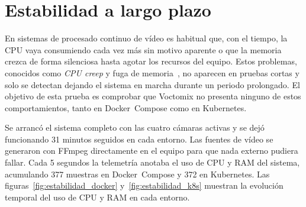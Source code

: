 \section{Estabilidad a largo plazo}
\label{sec:estabilidad}

En sistemas de procesado continuo de vídeo es habitual que, con el tiempo,
la CPU vaya consumiendo cada vez más sin motivo aparente o que la memoria
crezca de forma silenciosa hasta agotar los recursos del equipo. Estos
problemas, conocidos como \textit{CPU creep} y fuga de memoria~\cite{huang1995software}, no aparecen
en pruebas cortas y solo se detectan dejando el sistema en marcha durante un
periodo prolongado. El objetivo de esta prueba es comprobar que Voctomix no
presenta ninguno de estos comportamientos, tanto en Docker~Compose como en
Kubernetes.

Se arrancó el sistema completo con las cuatro cámaras activas y se dejó
funcionando 31 minutos seguidos en cada entorno. Las fuentes de vídeo se
generaron con FFmpeg directamente en el equipo para que nada externo pudiera
fallar. Cada 5 segundos la telemetría anotaba el uso de CPU y RAM del sistema,
acumulando 377 muestras en Docker~Compose y 372 en Kubernetes.
Las figuras~\ref{fig:estabilidad_docker} y~\ref{fig:estabilidad_k8s} muestran la evolución temporal del uso de CPU y RAM en cada entorno.

